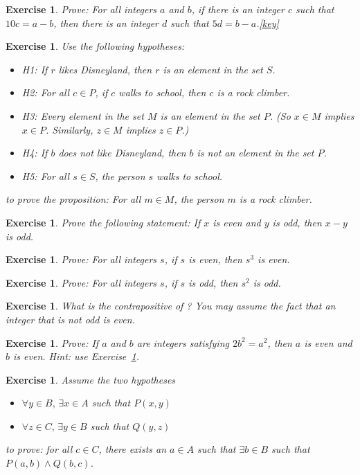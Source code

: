 \documentclass{book}
\newcounter{ekcounter}%
\theoremstyle{ekimcustom}
\newtheorem{exercise}[ekcounter]{Exercise}
\begin{document}
\begin{exercise}
Prove: For all integers $a$ and $b$, if there is an integer $c$ such that $10c=a-b$, then there is an integer $d$ such that $5d=b-a$.\quad\quad\href{https://www.sharelatex.com/project/59ceb71936e6671a14199b1e}{{\color{red}[key]}}
\end{exercise}

\begin{exercise}
Use the following hypotheses:
\begin{itemize}
\item H1: If $r$ likes Disneyland, then $r$ is an element in the set $S$.
\item H2: For all $c \in P$, if $c$ walks to school, then $c$ is a rock climber.
\item H3: Every element in the set $M$ is an element in the set $P$. (So $x \in M$ implies $x \in P$. Similarly, $z \in M$ implies $z \in P$.)
\item H4: If $b$ does not like Disneyland, then $b$ is not an element in the set $P$.
\item H5: For all $s \in S$, the person $s$ walks to school.
\end{itemize}
to prove the proposition: For all $m \in M$, the person $m$ is a rock climber.
\end{exercise}

\begin{exercise}
Prove the following statement: If $x$ is even and $y$ is odd, then $x-y$ is odd.
\end{exercise}
\begin{exercise}
Prove: For all integers $s$, if $s$ is even, then $s^3$ is even.
\end{exercise}
\begin{exercise}
Prove: For all integers $s$, if $s$ is odd, then $s^2$ is odd.
\end{exercise}
\begin{exercise}\label{exercise:contrapositive-squared-warmup}
What is the contrapositive of ? You may assume the fact that an integer that is not odd is even.
\end{exercise}
\begin{exercise}
Prove: If $a$ and $b$ are integers satisfying $2b^2=a^2$, then $a$ is even and $b$ is even. Hint: use Exercise~\ref{exercise:contrapositive-squared-warmup}.
\end{exercise}

\begin{exercise} %
Assume the two hypotheses
\begin{itemize}
\item $\forall y \in B,\, \exists x\in A$ such that $P(x,y)$
\item $\forall z \in C,\, \exists y \in B$ such that $Q(y,z)$
\end{itemize}
to prove: for all $c \in C$, there exists an $a \in A$ such that $\exists b \in B$ such that $P(a,b) \wedge Q(b,c)$.
\end{exercise}
\end{document}

